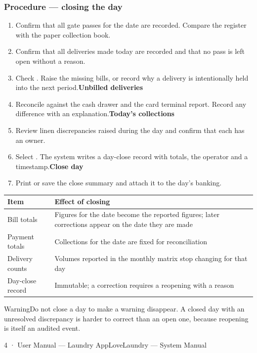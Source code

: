 \documentclass[11pt,a4paper,oneside]{book}
\begin{document}
\subsubsection*{Procedure — closing the day}
\begin{enumerate}
\item Confirm that all gate passes for the date are recorded. Compare the register with the paper collection book.
\item Confirm that all deliveries made today are recorded and that no pass is left open without a reason.
\item Check . Raise the missing bills, or record why a delivery is intentionally held into the next period.\textbf{Unbilled deliveries}
\item Reconcile  against the cash drawer and the card terminal report. Record any difference with an explanation.\textbf{Today's collections}
\item Review linen discrepancies raised during the day and confirm that each has an owner.
\item Select . The system writes a day-close record with totals, the operator and a timestamp.\textbf{Close day}
\item Print or save the close summary and attach it to the day's banking.
\end{enumerate}
\begin{center}\small
\begin{tabularx}{\linewidth}{|X|X|}
\hline
\rowcolor{lightgrey}
\textbf{Item} & \textbf{Effect of closing} \\ \hline
Bill totals & Figures for the date become the reported figures; later corrections appear on the date they are made \\ \hline
Payment totals & Collections for the date are fixed for reconciliation \\ \hline
Delivery counts & Volumes reported in the monthly matrix stop changing for that day \\ \hline
Day-close record & Immutable; a correction requires a reopening with a reason \\ \hline
\end{tabularx}
\end{center}
\begin{notebox}WarningDo not close a day to make a warning disappear. A closed day with an unresolved discrepancy is harder to correct than an open one, because reopening is itself an audited event.\end{notebox}
4 · User Manual — Laundry AppLoveLaundry — System Manual
\end{document}
